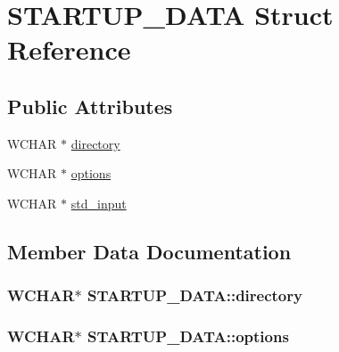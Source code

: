 \hypertarget{struct_s_t_a_r_t_u_p___d_a_t_a}{}\section{S\+T\+A\+R\+T\+U\+P\+\_\+\+D\+A\+T\+A Struct Reference}
\label{struct_s_t_a_r_t_u_p___d_a_t_a}
\subsection*{Public Attributes}
\begin{DoxyCompactItemize}
\item 
W\+C\+H\+A\+R $\ast$ \hyperlink{struct_s_t_a_r_t_u_p___d_a_t_a_a69ae02e3b63c91e4eac001f2346498ad}{directory}
\item 
W\+C\+H\+A\+R $\ast$ \hyperlink{struct_s_t_a_r_t_u_p___d_a_t_a_a808af94ff93a3487039b2649ae55c6c1}{options}
\item 
W\+C\+H\+A\+R $\ast$ \hyperlink{struct_s_t_a_r_t_u_p___d_a_t_a_ab5cb3f2722e767ee2e59637ae0fee16f}{std\+\_\+input}
\end{DoxyCompactItemize}


\subsection{Member Data Documentation}
\hypertarget{struct_s_t_a_r_t_u_p___d_a_t_a_a69ae02e3b63c91e4eac001f2346498ad}{}
\subsubsection[{directory}]{\setlength{\rightskip}{0pt plus 5cm}W\+C\+H\+A\+R$\ast$ S\+T\+A\+R\+T\+U\+P\+\_\+\+D\+A\+T\+A\+::directory}\label{struct_s_t_a_r_t_u_p___d_a_t_a_a69ae02e3b63c91e4eac001f2346498ad}
\hypertarget{struct_s_t_a_r_t_u_p___d_a_t_a_a808af94ff93a3487039b2649ae55c6c1}{}
\subsubsection[{options}]{\setlength{\rightskip}{0pt plus 5cm}W\+C\+H\+A\+R$\ast$ S\+T\+A\+R\+T\+U\+P\+\_\+\+D\+A\+T\+A\+::options}\label{struct_s_t_a_r_t_u_p___d_a_t_a_a808af94ff93a3487039b2649ae55c6c1}
\hypertarget{struct_s_t_a_r_t_u_p___d_a_t_a_ab5cb3f2722e767ee2e59637ae0fee16f}{}
